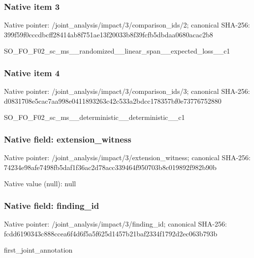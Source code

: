 \documentclass[10pt,a4paper]{article}
\begin{document}
\subsubsection{Native item 3}
Native pointer: /joint\_\allowbreak{}analysis/impact/3/comparison\_\allowbreak{}ids/2; canonical SHA-256: 399f59f0cccdbcff28414ab8f751ae13f20033b8f39fcfb5dbdaa0680acac2b8

\begingroup\raggedright\sloppy SO\_\allowbreak{}FO\_\allowbreak{}F02\_\allowbreak{}sc\_\allowbreak{}ms\_\allowbreak{}\_\allowbreak{}randomized\_\allowbreak{}\_\allowbreak{}linear\_\allowbreak{}span\_\allowbreak{}\_\allowbreak{}expected\_\allowbreak{}loss\_\allowbreak{}\_\allowbreak{}c1\par\endgroup

\subsubsection{Native item 4}
Native pointer: /joint\_\allowbreak{}analysis/impact/3/comparison\_\allowbreak{}ids/3; canonical SHA-256: d0831708e5cac7aa998e0411893263c42c533a2bdcc178357bf0e73776752880

\begingroup\raggedright\sloppy SO\_\allowbreak{}FO\_\allowbreak{}F02\_\allowbreak{}sc\_\allowbreak{}ms\_\allowbreak{}\_\allowbreak{}deterministic\_\allowbreak{}\_\allowbreak{}deterministic\_\allowbreak{}\_\allowbreak{}c1\par\endgroup

\subsubsection{Native field: extension\_\allowbreak{}witness}
Native pointer: /joint\_\allowbreak{}analysis/impact/3/extension\_\allowbreak{}witness; canonical SHA-256: 74234e98afe7498fb5daf1f36ac2d78acc339464f950703b8c019892f982b90b

Native value (null): null

\subsubsection{Native field: finding\_\allowbreak{}id}
Native pointer: /joint\_\allowbreak{}analysis/impact/3/finding\_\allowbreak{}id; canonical SHA-256: fcdd6190343c888ccea6f4d6f5a5f625d1457b21baf2334f1792d2ec063b793b

\begingroup\raggedright\sloppy first\_\allowbreak{}joint\_\allowbreak{}annotation\par\endgroup
\end{document}
